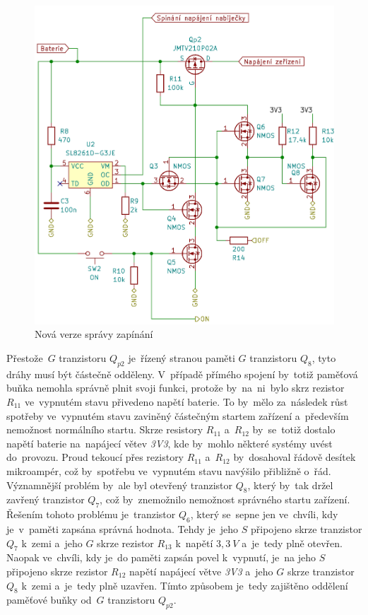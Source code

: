 \begin{figure}[h!]
    \centering
    \includegraphics[width=\textwidth]{text/PraktickaCast/img/power_manager.png}
    \caption{Nová verze správy zapínání}
    \label{fig:PoverManager}
\end{figure}

Přestože~\(G\) tranzistoru \(Q_{p2}\) je~řízený stranou paměti \(G\) tranzistoru \(Q_{8}\), tyto dráhy musí být částečně odděleny.
V~případě přímého spojení by~totiž paměťová buňka nemohla správně plnit svoji funkci, protože by~na~ni~bylo skrz rezistor \(R_{11}\) ve~vypnutém stavu přivedeno napětí baterie.
To by~mělo za~následek růst spotřeby ve~vypnutém stavu zaviněný částečným startem zařízení a~především nemožnost normálního startu.
Skrze resistory \(R_{11}\) a~\(R_{12}\) by~se~totiž dostalo napětí baterie na~napájecí větev {\it 3V3}, kde by~mohlo některé systémy uvést do~provozu.
Proud tekoucí přes rezistory \(R_{11}\) a~\(R_{12}\) by~dosahoval řádově desítek mikroampér, což by~spotřebu ve~vypnutém stavu navýšilo přibližně o~řád.
Významnější problém by~ale byl otevřený tranzistor \(Q_{8}\), který by~tak držel zavřený tranzistor \(Q_{7}\), což by~znemožnilo nemožnost správného startu zařízení.
Řešením tohoto problému je~tranzistor \(Q_{6}\), který se~sepne jen ve~chvíli, kdy je~v~paměti zapsána správná hodnota.
Tehdy je~jeho \(S\) připojeno skrze tranzistor \(Q_{7}\) k~zemi a~jeho \(G\) skrze rezistor \(R_{13}\) k~napětí \(3,3~V\) a~je~tedy plně otevřen.
Naopak ve~chvíli, kdy je~do paměti zapsán povel k~vypnutí, je~na jeho \(S\) připojeno skrze rezistor \(R_{12}\) napětí napájecí větve {\it 3V3} a~jeho \(G\) skrze tranzistor \(Q_{8}\) k~zemi a~je~tedy plně uzavřen.
Tímto způsobem je~tedy zajištěno oddělení paměťové buňky od~\(G\) tranzistoru \(Q_{p2}\).

